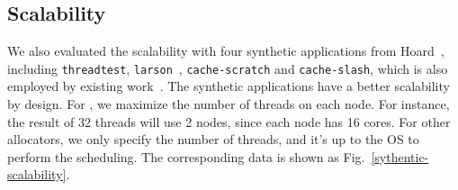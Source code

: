  

\subsection{Scalability}
\label{sec:scale}

We also evaluated the scalability with four synthetic applications from Hoard~\cite{Hoard}, including \texttt{threadtest}, \texttt{larson}~\cite{Larson}, \texttt{cache-scratch} and \texttt{cache-slash}, which is also employed by existing work~\cite{Scalloc}. The synthetic applications have a better scalability by design. 
For \NM{}, we maximize the number of threads on each node. For instance, the result of 32 threads will use 2 nodes, since each node has 16 cores. For other allocators, we only specify the number of threads, and it's up to the OS to perform the scheduling. The corresponding data is shown as Fig.~\ref{sythentic-scalability}. 


